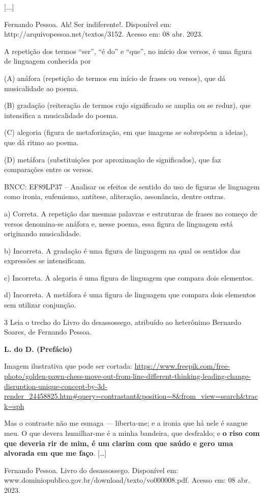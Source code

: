 \begin{itemize}
\begin{itemize}
{\begin{itemize}
\begin{itemize}
{[}...{]}

Fernando Pessoa. Ah! Ser indiferente!. Disponível em:
http://arquivopessoa.net/textos/3152. Acesso em: 08 abr. 2023.

A repetição dos termos ``ser'', ``é do'' e ``que'', no início dos
versos, é uma figura de linguagem conhecida por

(A) anáfora (repetição de termos em início de frases ou versos), que dá
musicalidade ao poema.

(B) gradação (reiteração de termos cujo significado se amplia ou se
reduz), que intensifica a musicalidade do poema.

(C) alegoria (figura de metaforização, em que imagens se sobrepõem a
ideias), que dá ritmo ao poema.

(D) metáfora (substituições por aproximação de significados), que faz
comparações entre os versos.

BNCC: EF89LP37 -- Analisar os efeitos de sentido do uso de figuras de
linguagem como ironia, eufemismo, antítese, aliteração, assonância,
dentre outras.

a) Correta. A repetição das mesmas palavras e estruturas de frases no
começo de versos denomina-se anáfora e, nesse poema, essa figura de
linguagem está originando musicalidade.

b) Incorreta. A gradação é uma figura de linguagem na qual os sentidos
das expressões se intensificam.

c) Incorreta. A alegoria é uma figura de linguagem que compara dois
elementos.

d) Incorreta. A metáfora é uma figura de linguagem que compara dois
elementos sem utilizar conjunção.

\num{3} Leia o trecho do Livro do desassossego, atribuído ao heterônimo
Bernardo Soares, de Fernando Pessoa.

\textbf{L. do D. (Prefácio)}

Imagem ilustrativa que pode ser cortada:
\url{https://www.freepik.com/free-photo/golden-pawn-chess-move-out-from-line-different-thinking-leading-change-disruption-unique-concept-by-3d-render_24458825.htm\#query=contrastant\&position=8\&from_view=search\&track=sph}

Mas o contraste não me esmaga --- liberta-me; e a ironia que há nele é
sangue meu. O que devera humilhar-me é a minha bandeira, que desfraldo;
e \textbf{o riso com que deveria rir de mim, é um clarim com que saúdo e
gero uma alvorada em que me faço}. {[}\ldots{}{]}

Fernando Pessoa. Livro do desassossego. Disponível em:
www.dominiopublico.gov.br/download/texto/vo000008.pdf. Acesso em: 08
abr. 2023.


\end{itemize}
\end{itemize}}
\end{itemize}
\end{itemize}

